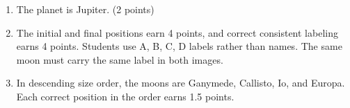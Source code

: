 \begin{enumerate}
\item The planet is Jupiter. \hfill(2 points)
\item The initial and final positions earn 4 points, and correct consistent labeling earns 4 points.
Students use A, B, C, D labels rather than names. The same moon must carry the same label in both images.
\item In descending size order, the moons are Ganymede, Callisto, Io, and Europa. Each correct position in the order earns 1.5 points.
\end{enumerate}
